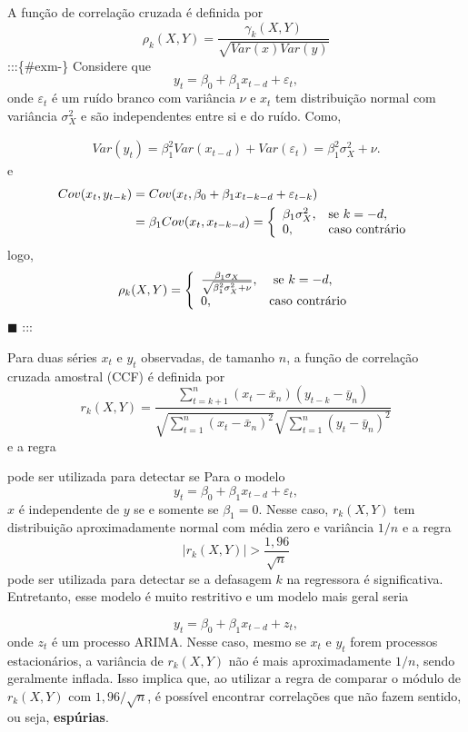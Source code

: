 \documentclass[
  letterpaper,
  DIV=11,
  numbers=noendperiod]{scrartcl}
\theoremstyle{plain}
\theoremstyle{plain}
\theoremstyle{definition}
\theoremstyle{definition}
\theoremstyle{remark}
\begin{document}
A função de correlação cruzada é definida por
\[\rho_k(X,Y)=\frac{\gamma_{k}(X,Y)}{\sqrt{Var(x)Var(y)}}\]
:::\{\#exm-\} Considere que
\[y_t = \beta_0+\beta_1 x_{t-d}+\varepsilon_t,\] onde \(\varepsilon_t\)
é um ruído branco com variância \(\nu\) e \(x_t\) tem distribuição
normal com variância \(\sigma^2_X\) e são independentes entre si e do
ruído. Como,

\[\begin{align}
Var(y_t)=\beta_1^2Var(x_{t-d})+Var(\varepsilon_t)=\beta_1^2\sigma^2_X+\nu.
\end{align}\] e \[\begin{align}
Cov(x_t,y_{t-k})&=Cov(x_t,\beta_0+\beta_1x_{t-k-d}+\varepsilon_{t-k})\\&=\beta_1Cov(x_t,x_{t-k-d})=\left\{\begin{array}{ll}\beta_1\sigma_X^2,&\hbox{se }k=-d,\\0,&\hbox{caso contrário}\end{array}\right.
\end{align}\] logo,
\[\rho_k(X,Y)=\left\{\begin{array}{ll}\frac{\beta_1\sigma_X}{\sqrt{\beta_1^2\sigma_X^2+\nu}},&\hbox{ se }k=-d,\\0,&\hbox{caso contrário}\end{array}\right.\]
\(\blacksquare\) :::

Para duas séries \(x_t\) e \(y_t\) observadas, de tamanho \(n\), a
função de correlação cruzada amostral (CCF) é definida por
\[r_k(X,Y)=\frac{\sum_{t=k+1}^n (x_t-\bar{x}_n)(y_{t-k}-\bar{y}_n)}{\sqrt{\sum_{t=1}^n(x_t-\bar{x}_n)^2}\sqrt{\sum_{t=1}^n(y_t-\bar{y}_n)^2}}\]
e a regra

pode ser utilizada para detectar se Para o modelo
\[y_t=\beta_0+\beta_1 x_{t-d}+\varepsilon_t,\] \(x\) é independente de
\(y\) se e somente se \(\beta_1=0\). Nesse caso, \(r_k(X,Y)\) tem
distribuição aproximadamente normal com média zero e variância \(1/n\) e
a regra \[|r_k(X,Y)|>\frac{1,96}{\sqrt{n}}\] pode ser utilizada para
detectar se a defasagem \(k\) na regressora é significativa. Entretanto,
esse modelo é muito restritivo e um modelo mais geral seria

\[y_t= \beta_0+\beta_1 x_{t-d}+z_t,\] onde \(z_t\) é um processo ARIMA.
Nesse caso, mesmo se \(x_t\) e \(y_t\) forem processos estacionários, a
variância de \(r_k(X,Y)\) não é mais aproximadamente \(1/n\), sendo
geralmente inflada. Isso implica que, ao utilizar a regra de comparar o
módulo de \(r_k(X,Y)\) com \(1,96/\sqrt{n}\), é possível encontrar
correlações que não fazem sentido, ou seja, \textbf{espúrias}.
\end{document}
